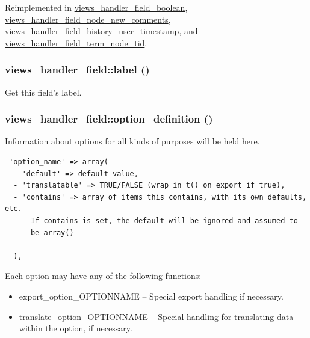 Reimplemented in \hyperlink{classviews__handler__field__boolean_0150fb8a25c2f1f2537d476b1c448238}{views\_\-handler\_\-field\_\-boolean}, \hyperlink{classviews__handler__field__node__new__comments_8f93300640b88efd9401dc2666fcc64a}{views\_\-handler\_\-field\_\-node\_\-new\_\-comments}, \hyperlink{classviews__handler__field__history__user__timestamp_0cc37c49613f0f55e4fc35733c35b806}{views\_\-handler\_\-field\_\-history\_\-user\_\-timestamp}, and \hyperlink{classviews__handler__field__term__node__tid_639e45d86c954e90120193b84c8b910b}{views\_\-handler\_\-field\_\-term\_\-node\_\-tid}.\hypertarget{classviews__handler__field_57c9be8a5a6a5f447c0320bf1a5378ee}{
\subsubsection[{label}]{\setlength{\rightskip}{0pt plus 5cm}views\_\-handler\_\-field::label ()}}
\label{classviews__handler__field_57c9be8a5a6a5f447c0320bf1a5378ee}


Get this field's label. \hypertarget{classviews__handler__field_64c69a8a3697603f8283405071c25b76}{
\subsubsection[{option\_\-definition}]{\setlength{\rightskip}{0pt plus 5cm}views\_\-handler\_\-field::option\_\-definition ()}}
\label{classviews__handler__field_64c69a8a3697603f8283405071c25b76}


Information about options for all kinds of purposes will be held here. 

\begin{Code}\begin{verbatim} 'option_name' => array(
  - 'default' => default value,
  - 'translatable' => TRUE/FALSE (wrap in t() on export if true),
  - 'contains' => array of items this contains, with its own defaults, etc.
      If contains is set, the default will be ignored and assumed to
      be array()

  ),
\end{verbatim}
\end{Code}

 Each option may have any of the following functions:\begin{itemize}
\item export\_\-option\_\-OPTIONNAME -- Special export handling if necessary.\item translate\_\-option\_\-OPTIONNAME -- Special handling for translating data within the option, if necessary. \end{itemize}


